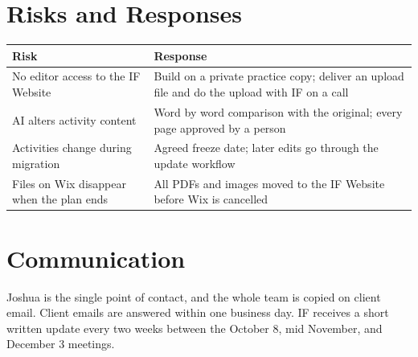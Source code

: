 \section{Risks and Responses}
\begin{tabularx}{\textwidth}{@{}LL@{}}
\toprule
\textbf{Risk} & \textbf{Response} \\
\midrule
No editor access to the IF Website & Build on a private practice copy; deliver an upload file and do the upload with IF on a call \\
AI alters activity content & Word by word comparison with the original; every page approved by a person \\
Activities change during migration & Agreed freeze date; later edits go through the update workflow \\
Files on Wix disappear when the plan ends & All PDFs and images moved to the IF Website before Wix is cancelled \\
\bottomrule
\end{tabularx}

\section{Communication}
Joshua is the single point of contact, and the whole team is copied on client email. Client emails are answered within one business day. IF receives a short written update every two weeks between the October 8, mid November, and December 3 meetings.


